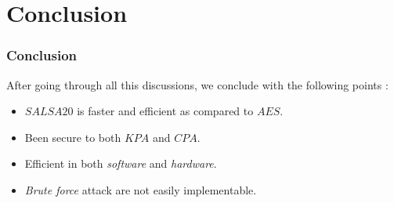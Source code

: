 \section{Conclusion}

\begin{frame}
\frametitle{Conclusion}
\begin{alertblock}{}
    After going through all this discussions, we conclude with the following points : 
    \begin{itemize}
        \item $SALSA20$ is faster and efficient as compared to $AES$.
        \item Been secure to both $KPA$ and $CPA$.
        \item Efficient in both \textit{software} and \textit{hardware}.
        \item \textit{Brute force} attack are not easily implementable.
    \end{itemize}
\end{alertblock}

\end{frame}